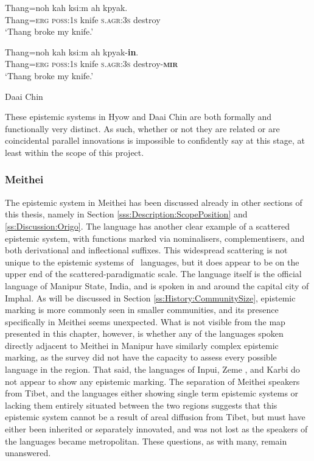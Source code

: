 \begin{exe}
\ex\label{e:History:DaaiChin}
\begin{xlist}
    \ex
\gll Thang=noh kah ksi:m ah kpyak. \\
Thang=\textsc{erg} \textsc{poss:1s} knife \textsc{s.agr:3s} destroy \\
\glt `Thang broke my knife.'

\ex
\gll Thang=noh kah ksi:m ah kpyak-\textbf{in}. \\
Thang=\textsc{erg} \textsc{poss:1s} knife \textsc{s.agr:3s} destroy-\textsc{\textbf{mir}} \\
\glt `Thang broke my knife.'
\end{xlist}
Daai Chin \cite[Kukish: Myanmar,][294]{SoHartmann2009}
\end{exe}

These epistemic systems in Hyow and Daai Chin are both formally and functionally very distinct. As such, whether or not they are related or are coincidental parallel innovations is impossible to confidently say at this stage, at least within the scope of this project.

\subsubsection{Meithei}
The epistemic system in Meithei \cite[Internal isolate: India,][]{Chelliah1997} has been discussed already in other sections of this thesis, namely in Section \ref{sss:Description:ScopePosition} and \ref{ss:Discussion:Origo}. The language has another clear example of a scattered epistemic system, with functions marked via nominalisers, complementisers, and both derivational and inflectional suffixes. This widespread scattering is not unique to the epistemic systems of \lfam\ languages, but it does appear to be on the upper end of the scattered-paradigmatic scale. The language itself is the official language of Manipur State, India, and is spoken in and around the capital city of Imphal. As will be discussed in Section \ref{ss:History:CommunitySize}, epistemic marking is more commonly seen in smaller communities, and its presence specifically in Meithei seems unexpected. What is not visible from the map presented in this chapter, however, is whether any of the languages spoken directly adjacent to Meithei in Manipur have similarly complex epistemic marking, as the survey did not have the capacity to assess every possible language in the region. That said, the languages of Inpui, Zeme \cites[both Zeme subfamily][]{Devi2014}{Chanu2017}, and Karbi \cite[Karbic][]{Konnerth2020} do not appear to show any epistemic marking. The separation of Meithei speakers from Tibet, and the languages either showing single term epistemic systems or lacking them entirely situated between the two regions suggests that this epistemic system cannot be a result of areal diffusion from Tibet, but must have either been inherited or separately innovated, and was not lost as the speakers of the languages became metropolitan. These questions, as with many, remain unanswered.

